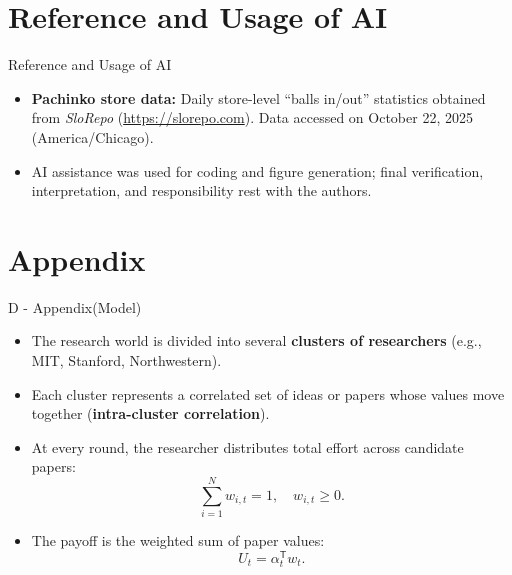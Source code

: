 \documentclass{beamer}
\begin{document}
\section{Reference and Usage of AI}

\begin{frame}{Reference and Usage of AI}
\begin{itemize}
    \item \textbf{Pachinko store data:} Daily store-level ``balls in/out'' statistics obtained from \emph{SloRepo} (\url{https://slorepo.com}). Data accessed on October 22, 2025 (America/Chicago).
    \item AI assistance was used for coding and figure generation; final verification, interpretation, and responsibility rest with the authors.
\end{itemize}
\end{frame}

\section{Appendix}
\begin{frame}{D - Appendix(Model)}
\begin{itemize}
    \item The research world is divided into several \textbf{clusters of researchers} 
          (e.g., MIT, Stanford, Northwestern).
    \item Each cluster represents a correlated set of ideas or papers whose values
          move together (\textbf{intra-cluster correlation}).
    \item At every round, the researcher distributes total effort 
          across candidate papers:
          \[
          \sum_{i=1}^{N} w_{i,t} = 1, \quad w_{i,t} \ge 0.
          \]
    \item The payoff is the weighted sum of paper values:
          \[
          U_t = \alpha_t^{\mathsf{T}} w_t.
          \]
\end{itemize}
\end{frame}
\end{document}
